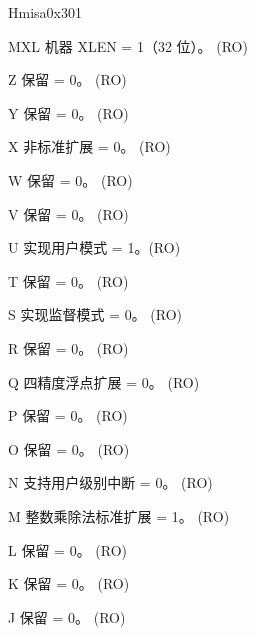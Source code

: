 \begin{register}{H}{misa}{0x301}\label{regdesc:LPMISA}
%
%
%
%
%
%
%
%
%
%
%
%
%
%
%
%
%
%
%
%
%
%
%
%
%
%
%
%
\regnewline%
\begin{regdesc}\begin{reglist}
\label{fielddesc:LPMISAMXL}\item [MXL] 机器 XLEN = 1（32 位）。 (RO)
\label{fielddesc:LPMISAZ}\item [Z] 保留 = 0。 (RO)
\label{fielddesc:LPMISAY}\item [Y] 保留 = 0。 (RO)
\label{fielddesc:LPMISAX}\item [X] 非标准扩展 = 0。 (RO)
\label{fielddesc:LPMISAW}\item [W] 保留 = 0。 (RO)
\label{fielddesc:LPMISAV}\item [V] 保留 = 0。 (RO)
\label{fielddesc:LPMISAU}\item [U] 实现用户模式 = 1。(RO)
\label{fielddesc:LPMISAT}\item [T] 保留 = 0。 (RO)
\label{fielddesc:LPMISAS}\item [S] 实现监督模式 = 0。 (RO)
\label{fielddesc:LPMISAR}\item [R] 保留 = 0。 (RO)
\label{fielddesc:LPMISAQ}\item [Q] 四精度浮点扩展 = 0。 (RO)
\label{fielddesc:LPMISAP}\item [P] 保留 = 0。 (RO)
\label{fielddesc:LPMISAO}\item [O] 保留 = 0。 (RO)
\label{fielddesc:LPMISAN}\item [N] 支持用户级别中断 = 0。 (RO)
\label{fielddesc:LPMISAM}\item [M] 整数乘除法标准扩展 = 1。 (RO)
\label{fielddesc:LPMISAL}\item [L] 保留 = 0。 (RO)
\label{fielddesc:LPMISAK}\item [K] 保留 = 0。 (RO)
\label{fielddesc:LPMISAJ}\item [J] 保留 = 0。 (RO)

\end{reglist}
\end{regdesc}
\end{register}

